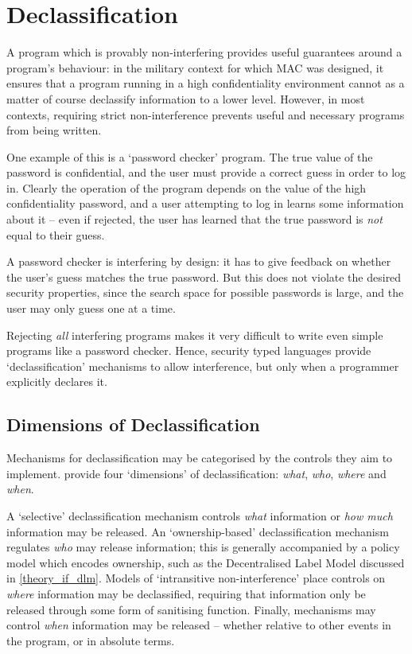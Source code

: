 \section{Declassification}

A program which is provably non-interfering provides useful guarantees around a program's behaviour: in the military context for which MAC was designed, it ensures that a program running in a high confidentiality environment cannot as a matter of course declassify information to a lower level. However, in most contexts, requiring strict non-interference prevents useful and necessary programs from being written.

One example of this is a `password checker' program. The true value of the password is confidential, and the user must provide a correct guess in order to log in. Clearly the operation of the program depends on the value of the high confidentiality password, and a user attempting to log in learns some information about it -- even if rejected, the user has learned that the true password is \textit{not} equal to their guess.

A password checker is interfering by design: it has to give feedback on whether the user's guess matches the true password. But this does not violate the desired security properties, since the search space for possible passwords is large, and the user may only guess one at a time.

Rejecting \textit{all} interfering programs makes it very difficult to write even simple programs like a password checker. Hence, security typed languages provide `declassification' mechanisms to allow interference, but only when a programmer explicitly declares it.

\subsection{Dimensions of Declassification}

Mechanisms for declassification may be categorised by the controls they aim to implement. \citeauthor{sabelfeld2005dimensions} \cite{sabelfeld2005dimensions} provide four `dimensions' of declassification: \textit{what}, \textit{who}, \textit{where} and \textit{when}.

A `selective' declassification mechanism controls \textit{what} information or \textit{how much} information may be released. An `ownership-based' declassification mechanism regulates \textit{who} may release information; this is generally accompanied by a policy model which encodes ownership, such as the Decentralised Label Model discussed in \ref{theory_if_dlm}. Models of `intransitive non-interference' \cite{roscoe1999intransitive} place controls on \textit{where} information may be declassified, requiring that information only be released through some form of sanitising function. Finally, mechanisms may control \textit{when} information may be released -- whether relative to other events in the program, or in absolute terms.

